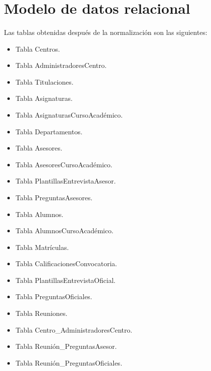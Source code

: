 \section{Modelo de datos relacional}

  \paragraph{}Las tablas obtenidas después de la normalización son las
  siguientes:

  \begin{itemize}
   \item Tabla Centros.
   \item Tabla AdministradoresCentro.
   \item Tabla Titulaciones.
   \item Tabla Asignaturas.
   \item Tabla AsignaturasCursoAcadémico.
   \item Tabla Departamentos.
   \item Tabla Asesores.
   \item Tabla AsesoresCursoAcadémico.
   \item Tabla PlantillasEntrevistaAsesor.
   \item Tabla PreguntasAsesores.
   \item Tabla Alumnos.
   \item Tabla AlumnosCursoAcadémico.
   \item Tabla Matrículas.
   \item Tabla CalificacionesConvocatoria.
   \item Tabla PlantillasEntrevistaOficial.
   \item Tabla PreguntasOficiales.
   \item Tabla Reuniones.
   \item Tabla Centro\_AdministradoresCentro.
   \item Tabla Reunión\_PreguntasAsesor.
   \item Tabla Reunión\_PreguntasOficiales.
  \end{itemize}

